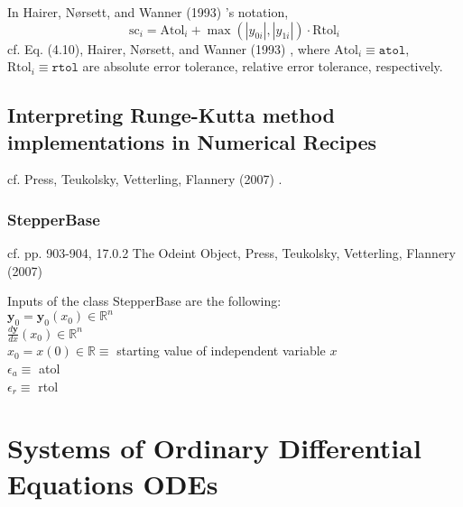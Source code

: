 \documentclass[10pt]{amsart}
\begin{document}
\begin{multicols*}{2}
In Hairer, N\o rsett, and Wanner (1993) \cite{HNW1993}'s notation,
\begin{equation}
	\text{sc}_i = \text{Atol}_i + \max{(|y_{0i}|, |y_{1i}|)} \cdot \text{Rtol}_i
\end{equation}
cf. Eq. (4.10), Hairer, N\o rsett, and Wanner (1993) \cite{HNW1993}, where $\text{Atol}_i \equiv \texttt{atol}$, $\text{Rtol}_i \equiv \texttt{rtol}$ are absolute error tolerance, relative error tolerance, respectively.


\subsection{Interpreting Runge-Kutta method implementations in \textbf{Numerical Recipes}}

cf. Press, Teukolsky, Vetterling, Flannery (2007) \cite{PTVF2007}.

\subsubsection{StepperBase}

cf. pp. 903-904, 17.0.2 The Odeint Object, Press, Teukolsky, Vetterling, Flannery (2007) \cite{PTVF2007}

Inputs of the class StepperBase are the following: \\
$\mathbf{y}_0 = \mathbf{y}_0(x_0) \in \mathbb{R}^n$ \\
$\frac{d\mathbf{y}}{dx}(x_0) \in \mathbb{R}^n $ \\
$x_0 = x(0) \in \mathbb{R} \equiv $ starting value of independent variable $x$ \\
$\epsilon_a \equiv $ atol \\
$\epsilon_r \equiv $ rtol \\




\section{Systems of Ordinary Differential Equations ODEs}


\end{multicols*}
\end{document}
